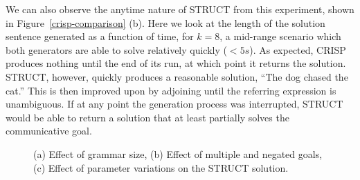We can also observe the anytime nature of STRUCT from this experiment,
shown in Figure~\ref{crisp-comparison} (b).  Here we look at the
length of the solution sentence generated as a function of time, for
$k=8$, a mid-range scenario which both generators are able to solve
relatively quickly ($< 5s$).  As expected, CRISP produces nothing until
the end of its run, at which point it returns the solution. STRUCT,
however, quickly produces a reasonable solution, ``The dog chased the
cat.''  This is then improved upon by adjoining until the referring
expression is unambiguous. If at any point the generation process was
interrupted, STRUCT would be able to return a solution that at least
partially solves the communicative goal.

\begin{figure}
\centering
{}
\caption{(a) Effect of grammar size, (b) Effect of multiple and negated
  goals, (c) Effect of parameter variations on the STRUCT solution. }
\end{figure}


